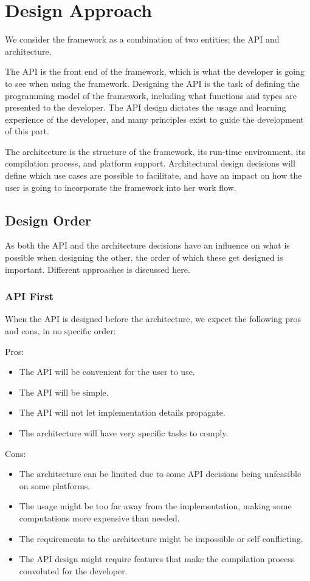 \section{Design Approach}
We consider the framework as a combination of two entities; the API and architecture.

The API is the front end of the framework, which is what the developer is going to see when using the framework. Designing the API is the task of defining the programming model of the framework, including what functions and types are presented to the developer. The API design dictates the usage and learning experience of the developer, and many principles exist to guide the development of this part. 

The architecture is the structure of the framework, its run-time environment, its compilation process, and platform support. Architectural design decisions will define which use cases are possible to facilitate, and have an impact on how the user is going to incorporate the framework into her work flow.

\subsection{Design Order}
As both the API and the architecture decisions have an influence on what is possible when designing the other, the order of which these get designed is important. Different approaches is discussed here.

\subsubsection{API First}
When the API is designed before the architecture, we expect the following pros and cons, in no specific order:

Pros:
\begin{itemize}
\item The API will be convenient for the user to use.
\item The API will be simple.
\item The API will not let implementation details propagate.
\item The architecture will have very specific tasks to comply.
\end{itemize}

Cons:
\begin{itemize}
\item The architecture can be limited due to some API decisions being unfeasible on some platforms.
\item The usage might be too far away from the implementation, making some computations more expensive than needed.
\item The requirements to the architecture might be impossible or self conflicting.
\item The API design might require features that make the compilation process convoluted for the developer.
\end{itemize}

